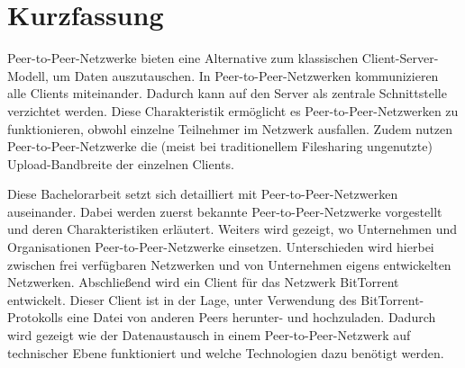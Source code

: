 \chapter{Kurzfassung}

Peer-to-Peer-Netzwerke bieten eine Alternative zum klassischen Client-Server-Modell, um Daten auszutauschen. In Peer-to-Peer-Netzwerken kommunizieren alle Clients miteinander. Dadurch kann auf den Server als zentrale Schnittstelle verzichtet werden. Diese Charakteristik ermöglicht es Peer-to-Peer-Netzwerken zu funktionieren, obwohl einzelne Teilnehmer im Netzwerk ausfallen. Zudem nutzen Peer-to-Peer-Netzwerke die (meist bei traditionellem Filesharing ungenutzte) Upload-Bandbreite der einzelnen Clients. 

Diese Bachelorarbeit setzt sich detailliert mit Peer-to-Peer-Netzwerken auseinander. Dabei werden zuerst bekannte Peer-to-Peer-Netzwerke vorgestellt und deren Charakteristiken erläutert. Weiters wird gezeigt, wo Unternehmen und Organisationen Peer-to-Peer-Netzwerke einsetzen. Unterschieden wird hierbei zwischen frei verfügbaren Netzwerken und von Unternehmen eigens entwickelten Netzwerken. Abschließend wird ein Client für das Netzwerk BitTorrent entwickelt. Dieser Client ist in der Lage, unter Verwendung des BitTorrent-Protokolls eine Datei von anderen Peers herunter- und hochzuladen. Dadurch wird gezeigt wie der Datenaustausch in einem Peer-to-Peer-Netzwerk auf technischer Ebene funktioniert und welche Technologien dazu benötigt werden.